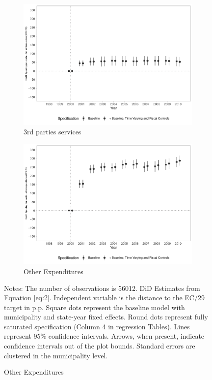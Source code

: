 \begin{figure}[h!]
\begin{center}
    \begin{subfigure}{0.48\textwidth}
        \centering
        \caption{\scriptsize 3rd parties services}\label{fig:10c}
        \includegraphics[width=\textwidth]{plots/siops_despservicoster_pcapita_dist_ec29_baseline_dist_ec29_baseline_10.pdf}
    \end{subfigure}
    \begin{subfigure}{0.48\textwidth}
        \centering
        \caption{\scriptsize Other Expenditures}\label{fig:10d}
        \includegraphics[width=\textwidth]{plots/siops_despoutros_pcapita_dist_ec29_baseline_dist_ec29_baseline_10.pdf}
    \end{subfigure}
    
    \end{center}
    
        \scriptsize{Notes: The number of observations is 56012. DiD Estimates from Equation \ref{eq:2}. Independent variable is the distance to the EC/29 target in p.p. Square dots represent the baseline model with municipality and state-year fixed effects. Round dots represent fully saturated specification (Column 4 in regression Tables). Lines represent 95\% confidence intervals. Arrows, when present, indicate confidence intervals out of the plot bounds. Standard errors are clustered in the municipality level.}
    
\end{figure}